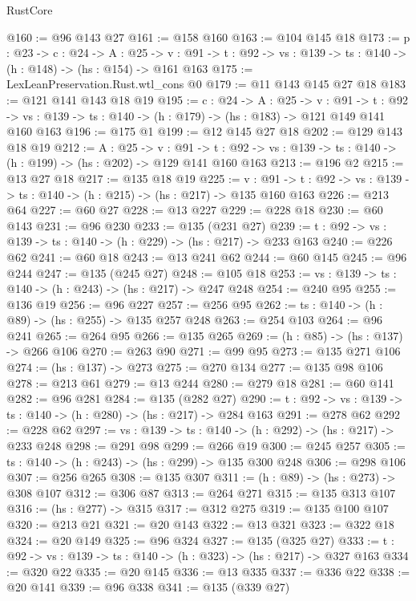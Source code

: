 \begin{lexlean}{RustCore}
\begin{coremodule}
@160 := @96 @143 @27
@161 := @158 @160
@163 := @104 @145 @18
@173 := {p : @23} ->
  {c : @24} ->
  {A : @25} ->
  {v : @91} -> {t : @92} -> {vs : @139} -> {ts : @140} -> (h : @148) -> (hs : @154) -> @161 @163
@175 := LexLeanPreservation.Rust.wtl_cons @0
@179 := @11 @143 @145 @27 @18
@183 := @121 @141 @143 @18 @19
@195 := {c : @24} ->
  {A : @25} ->
  {v : @91} ->
  {t : @92} -> {vs : @139} -> {ts : @140} -> (h : @179) -> (hs : @183) -> @121 @149 @141 @160 @163
@196 := @175 @1
@199 := @12 @145 @27 @18
@202 := @129 @143 @18 @19
@212 := {A : @25} ->
  {v : @91} ->
  {t : @92} -> {vs : @139} -> {ts : @140} -> (h : @199) -> (hs : @202) -> @129 @141 @160 @163
@213 := @196 @2
@215 := @13 @27 @18
@217 := @135 @18 @19
@225 := {v : @91} ->
  {t : @92} -> {vs : @139} -> {ts : @140} -> (h : @215) -> (hs : @217) -> @135 @160 @163
@226 := @213 @64
@227 := @60 @27
@228 := @13 @227
@229 := @228 @18
@230 := @60 @143
@231 := @96 @230
@233 := @135 (@231 @27)
@239 := {t : @92} -> {vs : @139} -> {ts : @140} -> (h : @229) -> (hs : @217) -> @233 @163
@240 := @226 @62
@241 := @60 @18
@243 := @13 @241 @62
@244 := @60 @145
@245 := @96 @244
@247 := @135 (@245 @27)
@248 := @105 @18
@253 := {vs : @139} -> {ts : @140} -> (h : @243) -> (hs : @217) -> @247 @248
@254 := @240 @95
@255 := @136 @19
@256 := @96 @227
@257 := @256 @95
@262 := {ts : @140} -> (h : @89) -> (hs : @255) -> @135 @257 @248
@263 := @254 @103
@264 := @96 @241
@265 := @264 @95
@266 := @135 @265
@269 := (h : @85) -> (hs : @137) -> @266 @106
@270 := @263 @90
@271 := @99 @95
@273 := @135 @271 @106
@274 := (hs : @137) -> @273
@275 := @270 @134
@277 := @135 @98 @106
@278 := @213 @61
@279 := @13 @244
@280 := @279 @18
@281 := @60 @141
@282 := @96 @281
@284 := @135 (@282 @27)
@290 := {t : @92} -> {vs : @139} -> {ts : @140} -> (h : @280) -> (hs : @217) -> @284 @163
@291 := @278 @62
@292 := @228 @62
@297 := {vs : @139} -> {ts : @140} -> (h : @292) -> (hs : @217) -> @233 @248
@298 := @291 @98
@299 := @266 @19
@300 := @245 @257
@305 := {ts : @140} -> (h : @243) -> (hs : @299) -> @135 @300 @248
@306 := @298 @106
@307 := @256 @265
@308 := @135 @307
@311 := (h : @89) -> (hs : @273) -> @308 @107
@312 := @306 @87
@313 := @264 @271
@315 := @135 @313 @107
@316 := (hs : @277) -> @315
@317 := @312 @275
@319 := @135 @100 @107
@320 := @213 @21
@321 := @20 @143
@322 := @13 @321
@323 := @322 @18
@324 := @20 @149
@325 := @96 @324
@327 := @135 (@325 @27)
@333 := {t : @92} -> {vs : @139} -> {ts : @140} -> (h : @323) -> (hs : @217) -> @327 @163
@334 := @320 @22
@335 := @20 @145
@336 := @13 @335
@337 := @336 @22
@338 := @20 @141
@339 := @96 @338
@341 := @135 (@339 @27)

\end{coremodule}
\end{lexlean}
